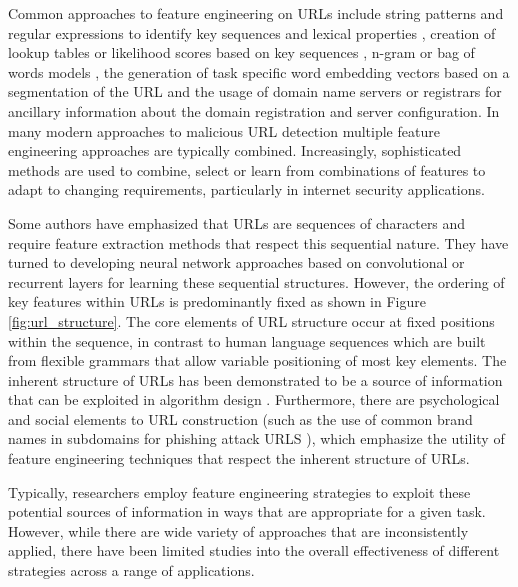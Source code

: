 \documentclass{aircc}
\begin{document}
Common approaches to feature engineering on URLs include string patterns and regular 
expressions to identify key sequences and lexical properties 
\cite{Kan2004,Garera2007,Mamun2016,Tupsamudre2019}, 
creation of lookup tables or likelihood scores based on key sequences
\cite{Meshkizadeh2010}, n-gram or bag of words models \cite{Baykan2009,Verma2017}, 
the generation of task specific word embedding vectors based on a segmentation of the 
URL \cite{Le2018,Qiu2020} and the usage of domain name servers or registrars for 
ancillary information about the domain registration 
and server configuration\cite{Canali2011,Li2020}. 
In many modern approaches to malicious URL detection
multiple feature engineering approaches are typically combined\cite{Sayamber2014,Li2020}.
Increasingly, sophisticated methods are used to combine, select or learn from 
combinations of features to adapt to changing requirements, particularly in 
internet security applications\cite{Sountharrajan2020,Li2020}.

Some authors have emphasized that URLs are sequences of characters and require 
feature extraction methods that respect 
this sequential nature\cite{Le2018,Vazhayil2018}. 
They have turned to developing neural network approaches
based on convolutional or recurrent layers for learning these sequential structures.
However, the ordering of key features within URLs is predominantly fixed as shown 
in Figure \ref{fig:url_structure}. The core elements of URL structure occur at 
fixed positions within the sequence, in contrast to human language
sequences which are built from flexible grammars that allow variable positioning of 
most key elements. The inherent structure of URLs has been demonstrated to be a source 
of information that can be exploited in algorithm design \cite{Shih2004}. Furthermore,
there are psychological and social elements to URL construction (such as the use of 
common brand names in subdomains for phishing attack URLS \cite{Tupsamudre2019}), 
which emphasize the utility of feature engineering techniques that
respect the inherent structure of URLs.

Typically, researchers employ feature engineering strategies to exploit these 
potential sources of information
in ways that are appropriate for a given task. However, while there are wide variety
of approaches that are inconsistently applied, there have been limited studies into
the overall effectiveness of different strategies across a range of applications.
\end{document}
